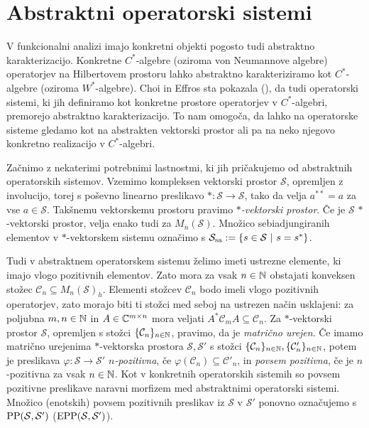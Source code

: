 \section{Abstraktni operatorski sistemi}\label{sec:9}

V funkcionalni analizi imajo konkretni objekti pogosto tudi abstraktno karakterizacijo.
Konkretne $C^*$-algebre (oziroma von Neumannove algebre) operatorjev na Hilbertovem prostoru lahko abstraktno karakteriziramo 
kot $C^*$-algebre (oziroma $W^*$-algebre).
Choi in Effros sta pokazala (\cite{choieffros1977}), da tudi operatorski sistemi, ki jih definiramo kot konkretne prostore operatorjev v $C^*$-algebri, 
premorejo abstraktno karakterizacijo. To nam omogoča, da lahko na operatorske sisteme gledamo kot na abstrakten vektorski prostor
ali pa na neko njegovo konkretno realizacijo v $C^*$-algebri.

Začnimo z nekaterimi potrebnimi lastnostmi, ki jih pričakujemo od abstraktnih operatorskih sistemov.
Vzemimo kompleksen vektorski prostor $\mathcal{S}$, opremljen z involucijo, torej s poševno linearno preslikavo 
$*: \mathcal{S} \to \mathcal{S}$, tako da velja $a^{**} = a$ za vse $a \in \mathcal{S}$.
Takšnemu vektorskemu prostoru pravimo \emph{$*$-vektorski prostor}. 
Če je $\mathcal{S}$ $*$-vektorski prostor, velja enako tudi za $M_n (\mathcal{S})$.
Množico sebiadjungiranih elementov v $*$-vektorskem sistemu označimo s 
$\mathcal{S}_{\operatorname{sa}} := \{s \in \mathcal{S}\ |\ s = s^*\}$.

Tudi v abstraktnem operatorskem sistemu želimo imeti ustrezne elemente, ki imajo vlogo pozitivnih elementov.
Zato mora za vsak $n \in \mathbb N$ obstajati konveksen stožec $\mathcal{C}_n \subseteq M_n (\mathcal{S})_h$.
Elementi stožcev $\mathcal{C}_n$ bodo imeli vlogo pozitivnih operatorjev, zato morajo biti ti stožci med seboj na ustrezen način usklajeni:
za poljubna $m, n \in \mathbb N$ in $A \in \mathbb C^{m \times n}$ mora veljati $A^* \mathcal{C}_m A \subseteq \mathcal{C}_n$.
Za $*$-vektorski prostor $\mathcal{S}$, opremljen s stožci $\{\mathcal{C}_n\}_{n \in \mathbb N}$,
pravimo, da je \emph{matrično urejen}. Če imamo matrično urejenima $*$-vektorska prostora $\mathcal{S}, \mathcal{S}'$ s stožci $\{\mathcal{C}_n\}_{n \in \mathbb N}, \{\mathcal{C}_n '\}_{n \in \mathbb N}$,
potem je preslikava $\varphi: \mathcal{S} \to \mathcal{S}'$ \emph{$n$-pozitivna}, če $\varphi(\mathcal{C}_n) \subseteq \mathcal{C}' _n$,
in \emph{povsem pozitivna}, če je $n$-pozitivna za vsak $n \in \mathbb N$. Kot v konkretnih operatorskih sistemih so 
povsem pozitivne preslikave naravni morfizem med abstraktnimi operatorski sistemi. Množico (enotskih) povsem pozitivnih preslikav iz $\mathcal{S}$ v $\mathcal{S}'$ 
ponovno označujemo s $\operatorname{PP} (\mathcal{S}, \mathcal{S}')$
($\operatorname{EPP} (\mathcal{S}, \mathcal{S}')$).

